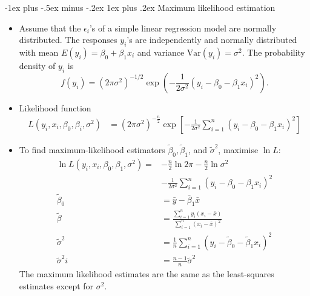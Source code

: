 \documentclass[frenchspacing,9pt,landscape,a4paper]{article}
\makeatletter
\renewcommand{\subsubsection}{\@startsection{subsubsection}{3}{0mm}%
                                {-1ex plus -.5ex minus -.2ex}%
                                {1ex plus .2ex}%
                                {\normalfont\small\bfseries}}
\makeatother
\begin{document}
\begin{multicols}{3}
\subsubsection{Maximum likelihood estimation}
\begin{itemize}
	\item Assume that the $\epsilon_i$'s of a simple linear regression model are normally distributed. The responses  $y_i$'s are independently and normally distributed with mean  $E(y_i)=\beta_0+\beta_1 x_i$ and variance $\text{Var}(y_i)=\sigma^2$. The probability density of  $y_i$ is
		 \[
			 f(y_i)=(2\pi\sigma^2)^{-1 /2}\exp\left(-\frac{1}{2\sigma^2}(y_i-\beta_0-\beta_1x_i)^2\right)
		.\] 
	\item Likelihood function
		\begin{align*}
			L(y_i,x_i,\beta_0,\beta_i,\sigma^2)&=(2\pi\sigma^2)^{-\frac{n}{2}}\exp\left[-\frac{1}{2\sigma^2}\sum_{i=1}^n(y_i-\beta_0-\beta_1 x_i)^2\right]
		\end{align*}
	\item To find maximum-likelihood estimators $\tilde{\beta}_0,\tilde{\beta}_1$, and  $\tilde{\sigma}^2$, maximise $\ln L$:
		\begin{align*}
			\ln L(y_i,x_i,\beta_0,\beta_1,\sigma^2)=&-\frac{n}{2}\ln 2\pi-\frac{n}{2}\ln\sigma^2\\
												   &-\frac{1}{2\sigma^2}\sum_{i=1}^n(y_i-\beta_0-\beta_1 x_i)^2\\
			\tilde{\beta}_0&=\bar{y}-\bar{\beta}_1\bar{x}\\
			\tilde{\beta}&=\frac{\sum_{i=1}^n y_i(x_i-\bar{x})}{\sum_{i=1}^n(x_i-\bar{x})^2}\\
			\tilde{\sigma}^2&=\frac{1}{n}\sum_{i=1}^n(y_i-\tilde{\beta}_0-\tilde{\beta}_1 x_i)^2\\
			\tilde{\sigma}^2i&=\frac{n-1}{n}\tilde{\sigma}^2
		\end{align*} The maximum likelihood estimates are the same as the least-squares estimates except for $\sigma^2$.
\end{itemize}

\end{multicols}
\end{document}
